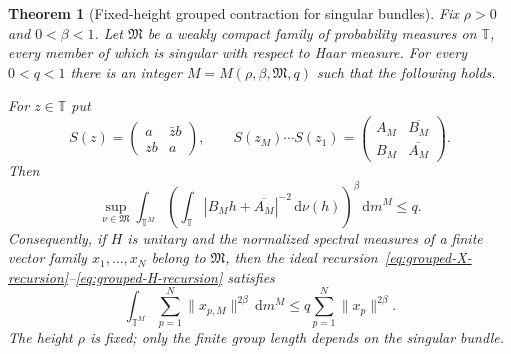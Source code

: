 \documentclass[11pt]{article}
\newtheorem{theorem}{Theorem}[section]
\theoremstyle{remark}
\newcommand{\T}{\mathbb T}
\newcommand{\dd}{\,\mathrm d}
\begin{document}
\begin{theorem}[Fixed-height grouped contraction for singular bundles]
\label{thm:singular-bundle-grouped-contraction}
Fix $\rho>0$ and $0<\beta<1$.  Let $\mathfrak M$ be a weakly compact family
of probability measures on $\T$, every member of which is singular with
respect to Haar measure.  For every $0<q<1$ there is an integer
$M=M(\rho,\beta,\mathfrak M,q)$ such that the following holds.

For $z\in\T$ put
\begin{equation}
 S(z)=
 \begin{pmatrix}a&\bar z b\\zb&a\end{pmatrix},
 \qquad
 S(z_M)\cdots S(z_1)=
 \begin{pmatrix}A_M&\overline{B_M}\\B_M&\overline{A_M}\end{pmatrix}.
 \label{eq:su11-random-product}
\end{equation}
Then
\begin{equation}
 \sup_{\nu\in\mathfrak M}
 \int_{\T^M}
 \left(
  \int_\T |B_Mh+\overline{A_M}|^{-2}\dd\nu(h)
 \right)^\beta\dd m^M
 \leq q.
 \label{eq:singular-bundle-product-contraction}
\end{equation}
Consequently, if $H$ is unitary and the normalized spectral measures of a
finite vector family $x_1,\ldots,x_N$ belong to $\mathfrak M$, then the ideal
recursion~\eqref{eq:grouped-X-recursion}--\eqref{eq:grouped-H-recursion}
satisfies
\begin{equation}
 \int_{\T^M}\sum_{p=1}^N\|x_{p,M}\|^{2\beta}\dd m^M
 \leq q\sum_{p=1}^N\|x_p\|^{2\beta}.
 \label{eq:singular-vector-bundle-contraction}
\end{equation}
The height $\rho$ is fixed; only the finite group length depends on the
singular bundle.
\end{theorem}
\end{document}
